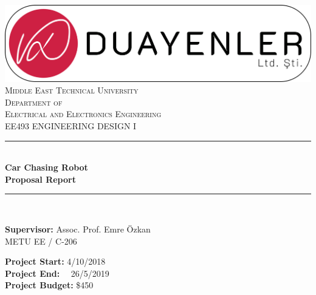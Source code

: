\documentclass[a4paper,12pt]{article}
\begin{document}
\begin{titlepage}

\newcommand{\HRule}{\rule{\linewidth}{0.5mm}} %
\centering 

\includegraphics[width=\textwidth,height=\textheight,keepaspectratio]{../../Documents/logos/logo3-with-stroke}\\[0.5cm]

\textsc{\LARGE Middle East Technical University}\\[0.5cm] %
\textsc{\Large Department of \\Electrical and Electronics Engineering }\\[0.5cm] %
\textsc{\large EE493 ENGINEERING DESIGN I}\\[0.5cm] %


\HRule \\[0cm]
{ \huge \bfseries  Car Chasing Robot\\[0.1cm] \LARGE \bfseries Proposal Report}\\[0cm] %
\HRule \\[1cm]

\begin{minipage}[l]{0.6\textwidth}
\raggedright
		\large{\textbf{Supervisor:}}	Assoc. Prof. Emre Özkan \\
		\hspace{3.05cm}\color{red}  METU EE / C-206

\end{minipage}
\begin{minipage}[r]{0.35\textwidth}
\raggedright
		\textbf{Project Start:} 4/10/2018\\
		\textbf{Project End:} \ \  26/5/2019\\
		\textbf{Project Budget:} \$450


\end{minipage}
\end{titlepage}
\end{document}
